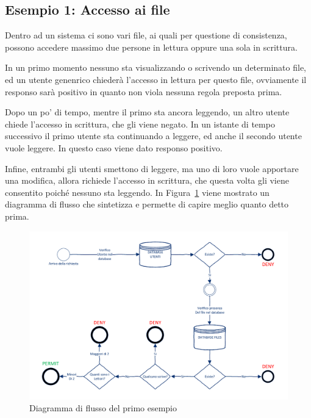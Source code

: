 \subsection*{Esempio 1: Accesso ai file} %
Dentro ad un sistema ci sono vari file, ai quali per questione di consistenza, possono accedere massimo due persone in lettura oppure una sola in scrittura.\\ \par
In un primo momento nessuno sta visualizzando o scrivendo un determinato file, ed un utente genenrico 
chiederà l'accesso in lettura per questo file, ovviamente il responso sarà positivo in quanto non viola nessuna regola preposta prima.\\ \par
Dopo un po' di tempo, mentre il primo sta ancora leggendo, un altro utente chiede l'accesso in scrittura, che gli viene negato.
In un istante di tempo successivo il primo utente sta continuando a leggere, ed anche il secondo utente vuole leggere. In questo caso viene dato responso positivo.\\ \par
Infine, entrambi gli utenti smettono di leggere, ma uno di loro vuole apportare una modifica, allora richiede l'accesso in scrittura, che questa volta gli viene consentito poiché nessuno sta leggendo.
In Figura~\ref{fig:diagrammaflussoprimoesempio} viene mostrato un diagramma di flusso che sintetizza e permette di capire meglio quanto detto prima.
\begin{figure}[H]
 \centering 
 \includegraphics[scale = 0.75]{./Visio_Project/DiagrammaFlussoPrimoEsempio.pdf}
 \caption{Diagramma di flusso del primo esempio}
 \label{fig:diagrammaflussoprimoesempio}
\end{figure}

